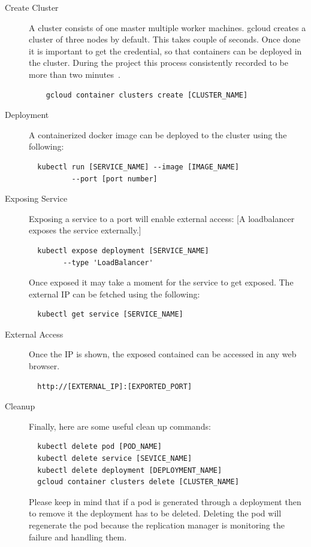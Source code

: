\begin{description}
\item[Create Cluster] A cluster consists of one master multiple worker
machines. gcloud creates a cluster of three nodes by default. This takes
couple of seconds. Once done it is important to get the credential, so that
containers can be deployed in the cluster. During the project this process
consistently recorded to be more than two minutes~\cite{hid-sp18-417-cluster-creation-video}.

  \begin{verbatim}
    gcloud container clusters create [CLUSTER_NAME]
  \end{verbatim}
\item[Deployment] A containerized docker image can be deployed to the cluster
using the following:
\begin{verbatim}
  kubectl run [SERVICE_NAME] --image [IMAGE_NAME] 
          --port [port number]
\end{verbatim}
\item [Exposing Service] Exposing a service to a port will enable external
access: [A loadbalancer exposes the service externally.]
\begin{verbatim}
  kubectl expose deployment [SERVICE_NAME] 
        --type 'LoadBalancer'
\end{verbatim}

Once exposed it may take a moment for the service to get exposed. The external
IP can be fetched using the following:

\begin{verbatim}
  kubectl get service [SERVICE_NAME]
\end{verbatim}

\item [External Access] Once the IP is shown, the exposed contained can be
accessed in any web browser.
\begin{verbatim}
  http://[EXTERNAL_IP]:[EXPORTED_PORT]
\end{verbatim}

\item [Cleanup] Finally, here are some useful clean up commands:
\begin{verbatim}
  kubectl delete pod [POD_NAME]
  kubectl delete service [SEVICE_NAME]
  kubectl delete deployment [DEPLOYMENT_NAME]
  gcloud container clusters delete [CLUSTER_NAME]
\end{verbatim}

  Please keep in mind that if a pod is generated through a deployment then to
  remove it the deployment has to be deleted. Deleting the pod will regenerate
  the pod because the replication manager is monitoring the failure and
  handling them.

\end{description}


